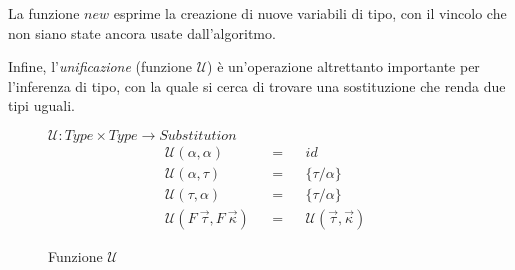 \noindent La funzione $new$ esprime la creazione di nuove variabili di tipo, con il vincolo che non siano state ancora usate dall'algoritmo.

\noindent Infine, l'\textit{unificazione} (funzione $\mathcal{U}$) è un'operazione altrettanto importante per l'inferenza di tipo,
con la quale si cerca di trovare una sostituzione che renda due tipi uguali.

\begin{figure}
    \vspace{4mm}
    $\mathcal{U} : Type \times Type \rightarrow Substitution$
    \newcommand{\funU}[2]{\mathcal{U}(#1, #2)}
    \newcommand{\funUline}[3]{& \funU{#1}{#2} & & = & & {#3}}
    \[
        \begin{aligned}
            \funUline{\alpha}{\alpha}{id}              \\
            \funUline{\alpha}{\tau}{\{\tau / \alpha\}} \\
            \funUline{\tau}{\alpha}{\{\tau / \alpha\}} \\
            \funUline{F\ \vec{\tau}}{F\ \vec{\kappa}}{\funU{\vec{\tau}}{\vec{\kappa}}}
        \end{aligned}
    \]
    \caption{Funzione $\mathcal{U}$}
    \label{fig:3-4-unification}
\end{figure}